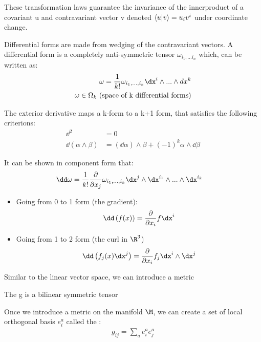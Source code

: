\documentclass[11pt]{scrartcl}
\begin{document}
These transformation laws guarantee the invariance of the innerproduct of a covariant u and contravariant vector v denoted $\braket{u | v} = u_i v^i$ under coordinate change.

Differential forms are made from wedging of the contravariant vectors.  A differential form is a completely anti-symmetric tensor $\omega_{i_1, ... i_n}$ which, can be written as:
\begin{align}
	\omega = {1 \over k!} \omega_{i_1, ..., i_k} \dx^i \wedge ... \wedge dx^k  \\
	\omega \in \Omega_k \text{ (space of k differential forms)}
\end{align}

The exterior derivative maps a k-form to a k+1 form, that satisfies the following criterions:
\begin{align}
	\dd^2 &= 0 \\
	\dd (\alpha \wedge \beta) &= (\dd \alpha) \wedge \beta + (-1)^k \alpha \wedge \dd \beta
\end{align}

It can be shown in component form that:
\begin{align}
	\dd \omega &= {1 \over k!} {\partial \over \partial x_j} \omega_{i_1, ..., i_k} \dx^j \wedge \dx^{i_1} \wedge ... \wedge \dx^{i_k}
\end{align}




\begin{example}
	\begin{itemize}
		\item Going from 0 to 1 form (the gradient):
		$$ \dd \left( f(x) \right)  = {\partial \over \partial x_i} f \dx^i$$
		\item Going from 1 to 2 form (the curl in $\R^3$)
		$$ \dd  \left( f_{j}(x) \dx^j \right) = {\partial \over \partial x_i} f_j \dx^i \wedge \dx^j$$
	\end{itemize}
\end{example}


Similar to the linear vector space, we can introduce a metric
\begin{definition}
	The  g is a bilinear symmetric tensor
\end{definition}

Once we introduce a metric on the manifold $\M$, we can create a set of local orthogonal basis $e^{a}_i$ called the :
\begin{align}
	g_{ij} = \sum_a e^{a}_i e^a_j
\end{align}
\end{document}
